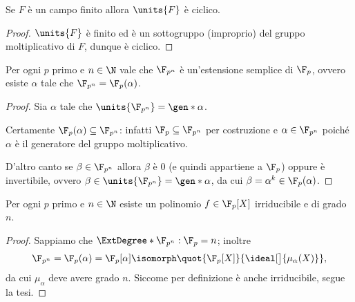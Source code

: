 \begin{corollary}
    Se $F$ è un campo finito allora $\units{F}$ è ciclico.
\end{corollary}
\begin{proof}
    $\units{F}$ è finito ed è un sottogruppo (improprio) del gruppo moltiplicativo di $F$, dunque è ciclico.
\end{proof}

\begin{corollary}
    Per ogni $p$ primo e $n \in \N$ vale che $\F_{p^n}$ è un'estensione semplice di $\F_p$, ovvero esiste $\alpha$ tale che $\F_{p^n} = \F_p(\alpha)$.
\end{corollary}
\begin{proof}
    Sia $\alpha$ tale che $\units{\F_{p^n}} = \gen*{\alpha}$. 

    Certamente $\F_p(\alpha) \subseteq \F_{p^n}$: infatti $\F_p \subseteq \F_{p^n}$ per costruzione e $\alpha \in \F_{p^n}$ poiché $\alpha$ è il generatore del gruppo moltiplicativo.

    D'altro canto se $\beta \in \F_{p^n}$ allora $\beta$ è $0$ (e quindi appartiene a $\F_p$) oppure è invertibile, ovvero $\beta \in \units{\F_{p^n}} = \gen*{\alpha}$, da cui $\beta = \alpha^k \in \F_p(\alpha)$.
\end{proof}

\begin{corollary}
    Per ogni $p$ primo e $n \in \N$ esiste un polinomio $f \in \F_p[X]$ irriducibile e di grado $n$.
\end{corollary}
\begin{proof}
    Sappiamo che $\ExtDegree*{\F_{p^n} : \F_p} = n$; inoltre \[
        \F_{p^n} = \F_p(\alpha) = \F_p[\alpha] \isomorph \quot{\F_p[X]}{\ideal[\big]{\mu_\alpha(X)}},   
    \] da cui $\mu_\alpha$ deve avere grado $n$. Siccome per definizione è anche irriducibile, segue la tesi.
\end{proof}